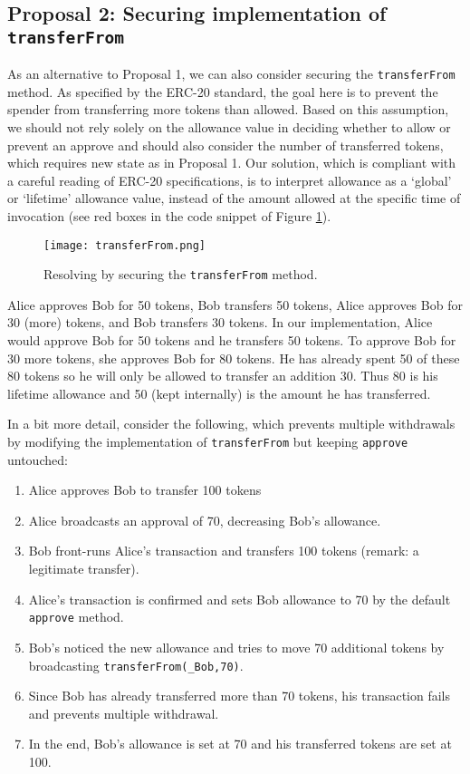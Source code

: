 \subsection{Proposal 2: Securing implementation of \texttt{transferFrom}}\label{subsec:prop2}
As an alternative to Proposal 1, we can also consider securing the \texttt{transferFrom} method. As specified by the ERC-20 standard, the goal here is to prevent the spender from transferring more tokens than allowed. Based on this assumption, we should not rely solely on the allowance value in deciding whether to allow or prevent an approve and should also consider the number of transferred tokens, which requires new state as in Proposal 1. Our solution, which is compliant with a careful reading of ERC-20 specifications, is to interpret allowance as a `global' or `lifetime' allowance value, instead of the amount allowed at the specific time of invocation (see red boxes in the code snippet of Figure \ref{fig:transfer}). 

\begin{figure}[t]
	\centering
	\texttt{[image: transferFrom.png]}
	\caption[Resolving \mwa in \texttt{transferFrom}]{Resolving \mwa by securing the \texttt{transferFrom} method.}
	\label{fig:transfer}
\end{figure}

\begin{example}
	Alice approves Bob for 50 tokens, Bob transfers 50 tokens, Alice approves Bob for 30 (more) tokens, and Bob transfers 30 tokens. In our implementation, Alice would approve Bob for 50 tokens and he transfers 50 tokens. To approve Bob for 30 more tokens, she approves Bob for 80 tokens. He has already spent 50 of these 80 tokens so he will only be allowed to transfer an addition 30. Thus 80 is his lifetime allowance and 50 (kept internally) is the amount he has transferred. 
\end{example}

In a bit more detail, consider the following, which prevents multiple withdrawals by modifying the implementation of \texttt{transferFrom} but keeping \texttt{approve} untouched:
\begin{enumerate}
	\item Alice approves Bob to transfer 100 tokens
	\item Alice broadcasts an approval of 70, decreasing Bob's allowance.
	\item Bob front-runs Alice’s transaction and transfers 100 tokens (remark: a legitimate transfer).
	\item Alice's transaction is confirmed and sets Bob allowance to 70 by the default \texttt{approve} method.
	\item Bob's noticed the new allowance and tries to move 70 additional tokens by broadcasting \texttt{transferFrom(\_Bob,70)}. 
	\item Since Bob has already transferred more than 70 tokens, his transaction fails and prevents multiple withdrawal. 
	\item In the end, Bob’s allowance is set at 70 and his transferred tokens are set at 100.
\end{enumerate}

